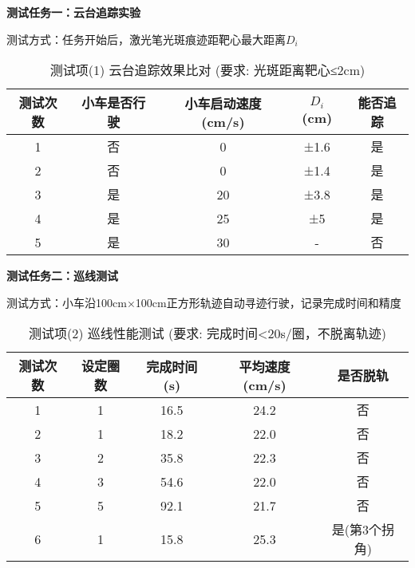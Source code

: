 \documentclass[UTF-8,zihao=-4]{ctexart}
\begin{document}
    \textbf{测试任务一：云台追踪实验}
    
    测试方式：任务开始后，激光笔光斑痕迹距靶心最大距离$D_i$
    
    \begin{table}[H]
        \centering
        \caption{测试项(1) 云台追踪效果比对 (要求: 光斑距离靶心≤2cm)}
        \label{tab:task1}
        \begin{tabular}{ccccc}
            \toprule
            测试次数 & 小车是否行驶 & 小车启动速度(cm/s) & $D_i$(cm) & 能否追踪 \\
            \midrule
            1 & 否 & 0 & ±1.6 & 是 \\
            2 & 否 & 0 & ±1.4 & 是 \\
            3 & 是 & 20 & ±3.8 & 是 \\
            4 & 是 & 25 & ±5 & 是 \\
            5 & 是 & 30 & - & 否 \\
            \bottomrule
        \end{tabular}
    \end{table}

    \textbf{测试任务二：巡线测试}
    
    测试方式：小车沿100cm×100cm正方形轨迹自动寻迹行驶，记录完成时间和精度
    
    \begin{table}[H]
        \centering
        \caption{测试项(2) 巡线性能测试 (要求: 完成时间<20s/圈，不脱离轨迹)}
        \label{tab:task2}
        \begin{tabular}{ccccc}
            \toprule
            测试次数 & 设定圈数 & 完成时间(s) & 平均速度(cm/s) & 是否脱轨 \\
            \midrule
            1 & 1 & 16.5 & 24.2 & 否 \\
            2 & 1 & 18.2 & 22.0 & 否 \\
            3 & 2 & 35.8 & 22.3 & 否 \\
            4 & 3 & 54.6 & 22.0 & 否 \\
            5 & 5 & 92.1 & 21.7 & 否 \\
            6 & 1 & 15.8 & 25.3 & 是(第3个拐角) \\
            \bottomrule
        \end{tabular}
    \end{table}
    
\end{document}
